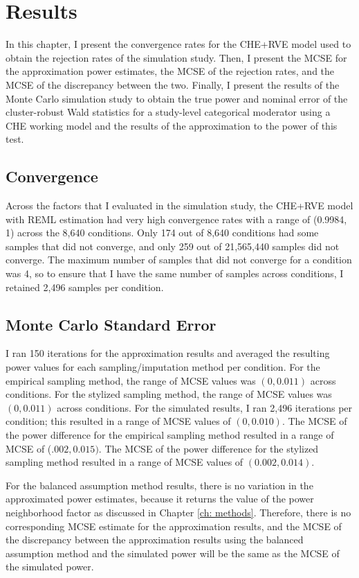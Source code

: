 \chapter{Results}\label{ch: results}

In this chapter, I present the convergence rates for the CHE+RVE model used to obtain the rejection rates of the simulation study. Then, I present the MCSE for the approximation power estimates, the MCSE of the rejection rates, and the MCSE of the discrepancy between the two. Finally, I present the results of the Monte Carlo simulation study to obtain the true power and nominal error of the cluster-robust Wald statistics for a study-level categorical moderator using a CHE working model and the results of the approximation to the power of this test.  

\section{Convergence}

Across the factors that I evaluated in the simulation study, the CHE+RVE model with REML estimation had very high convergence rates with a range of (0.9984, 1) across the 8,640 conditions. Only 174 out of 8,640 conditions had some samples that did not converge, and only 259 out of 21,565,440 samples did not converge. The maximum number of samples that did not converge for a condition was 4, so to ensure that I have the same number of samples across conditions, I retained 2,496 samples per condition. 

\section{Monte Carlo Standard Error}

I ran 150 iterations for the approximation results and averaged the resulting power values for each sampling/imputation method per condition. For the empirical sampling method, the range of MCSE values was $(0, 0.011)$ across conditions. For the stylized sampling method, the range of MCSE values was $(0, 0.011)$ across conditions. For the simulated results, I ran 2,496 iterations per condition; this resulted in a range of MCSE values of $(0, 0.010)$. The MCSE of the power difference for the empirical sampling method resulted in a range of MCSE of ($.002,  0.015)$. The MCSE of the power difference for the stylized sampling method resulted in a range of MCSE values of $(0.002, 0.014)$.

For the balanced assumption method results, there is no variation in the approximated power estimates, because it returns the value of the power neighborhood factor as discussed in Chapter \ref{ch: methods}. Therefore, there is no corresponding MCSE estimate for the approximation results, and the MCSE of the discrepancy between the approximation results using the balanced assumption method and the simulated power will be the same as the MCSE of the simulated power. 


